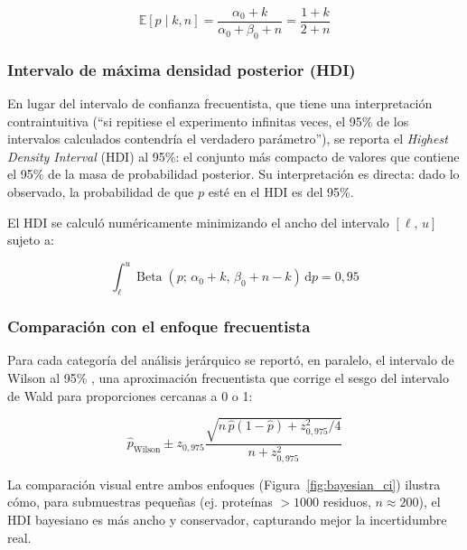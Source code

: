 \begin{equation}
    \mathbb{E}[p \mid k, n] = \frac{\alpha_0 + k}{\alpha_0 + \beta_0 + n}
    = \frac{1 + k}{2 + n}
    \label{eq:posterior_mean}
\end{equation}

\subsubsection{Intervalo de m\'axima densidad posterior (HDI)}

En lugar del intervalo de confianza frecuentista, que tiene una interpretaci\'on
contraintuitiva (``si repitiese el experimento infinitas veces, el 95\% de los
intervalos calculados contendr\'ia el verdadero par\'ametro''), se reporta el
\emph{Highest Density Interval} (HDI) al 95\%: el conjunto m\'as compacto de valores
que contiene el 95\% de la masa de probabilidad posterior. Su interpretaci\'on es directa:
dado lo observado, la probabilidad de que $p$ est\'e en el HDI es del 95\%.

El HDI se calcul\'o num\'ericamente minimizando el ancho del intervalo
$[\ell,\, u]$ sujeto a:

\begin{equation}
    \int_{\ell}^{u} \operatorname{Beta}(p;\, \alpha_0+k,\, \beta_0+n-k)\,\mathrm{d}p = 0{,}95
    \label{eq:hdi}
\end{equation}

\subsubsection{Comparaci\'on con el enfoque frecuentista}

Para cada categor\'ia del an\'alisis jer\'arquico se report\'o, en paralelo,
el intervalo de Wilson al 95\% \citep{Wilson1927}, una aproximaci\'on frecuentista
que corrige el sesgo del intervalo de Wald para proporciones cercanas a 0 o 1:

\begin{equation}
    \hat{p}_{\text{Wilson}} \pm z_{0{,}975}
    \frac{\sqrt{n\,\hat{p}(1-\hat{p}) + z_{0{,}975}^2/4}}{n + z_{0{,}975}^2}
    \label{eq:wilson}
\end{equation}

La comparaci\'on visual entre ambos enfoques (Figura~\ref{fig:bayesian_ci}) ilustra c\'omo,
para submuestras peque\~nas (ej. prote\'inas $>1000$ residuos, $n \approx 200$), el HDI
bayesiano es m\'as ancho y conservador, capturando mejor la incertidumbre real.

